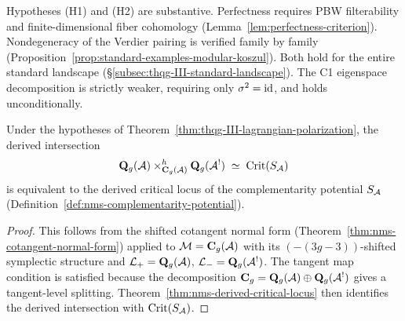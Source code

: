 \begin{remark}[Conditionality of (C2)]
\label{rem:thqg-III-conditionality}
Hypotheses (H1) and (H2) are substantive. Perfectness
requires PBW filterability and finite-dimensional fiber
cohomology (Lemma~\ref{lem:perfectness-criterion}).
Nondegeneracy of the Verdier pairing is verified family
by family
(Proposition~\ref{prop:standard-examples-modular-koszul}).
Both hold for the entire standard landscape
(\S\ref{subsec:thqg-III-standard-landscape}). The C1
eigenspace decomposition is strictly weaker, requiring
only $\sigma^2 = \mathrm{id}$, and holds unconditionally.
\end{remark}

\begin{corollary}
\label{cor:thqg-III-lagrangian-intersection}
Under the hypotheses of
Theorem~\textup{\ref{thm:thqg-III-lagrangian-polarization}},
the derived intersection
\begin{equation}\label{eq:thqg-III-lagrangian-intersection}
\mathbf{Q}_g(\mathcal{A})
\times^h_{\mathbf{C}_g(\mathcal{A})}
\mathbf{Q}_g(\mathcal{A}^!)
\;\simeq\;
\operatorname{Crit}(S_{\mathcal{A}})
\end{equation}
is equivalent to the derived critical locus of the
complementarity potential $S_{\mathcal{A}}$
\textup{(}Definition~\textup{\ref{def:nms-complementarity-potential})}.
\end{corollary}

\begin{proof}
This follows from the shifted cotangent normal form
(Theorem~\ref{thm:nms-cotangent-normal-form}) applied to
$\mathcal{M} = \mathbf{C}_g(\mathcal{A})$ with its
$(-(3g-3))$-shifted symplectic structure and
$\mathcal{L}_+ = \mathbf{Q}_g(\mathcal{A})$,
$\mathcal{L}_- = \mathbf{Q}_g(\mathcal{A}^!)$.
The tangent map condition is satisfied because the
decomposition $\mathbf{C}_g = \mathbf{Q}_g(\mathcal{A}) \oplus
\mathbf{Q}_g(\mathcal{A}^!)$ gives a tangent-level splitting.
Theorem~\ref{thm:nms-derived-critical-locus} then identifies
the derived intersection with $\operatorname{Crit}(S_{\mathcal{A}})$.
\end{proof}

